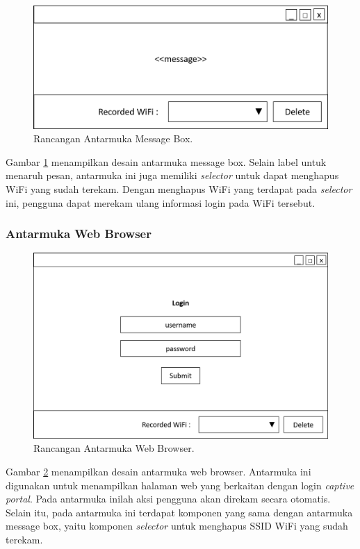 \begin{figure}[!htb]
    \centering
    \includegraphics[scale=0.5]{Gambar/UI_MessageBox.png}
    \caption[Rancangan Antarmuka Message Box.]{Rancangan Antarmuka Message Box.}
    \label{fig:RancanganAntarmukaMessageBox}
\end{figure}

Gambar \ref{fig:RancanganAntarmukaMessageBox} menampilkan desain antarmuka message box. Selain label untuk menaruh pesan, antarmuka ini juga memiliki \textit{selector} untuk dapat menghapus WiFi yang sudah terekam. Dengan menghapus WiFi yang terdapat pada \textit{selector} ini, pengguna dapat merekam ulang informasi login pada WiFi tersebut.

\subsubsection{Antarmuka Web Browser}
\label{subsec:antarmuka_web_browser}

\begin{figure}[!htb]
    \centering
    \includegraphics[scale=0.5]{Gambar/UI_WebBrowser.png}
    \caption[Rancangan Antarmuka Web Browser.]{Rancangan Antarmuka Web Browser.}
    \label{fig:RancanganAntarmukaWebBrowser}
\end{figure}

Gambar \ref{fig:RancanganAntarmukaWebBrowser} menampilkan desain antarmuka web browser. Antarmuka ini digunakan untuk menampilkan halaman web yang berkaitan dengan login \textit{captive portal}. Pada antarmuka inilah aksi pengguna akan direkam secara otomatis. Selain itu, pada antarmuka ini terdapat komponen yang sama dengan antarmuka message box, yaitu komponen \textit{selector} untuk menghapus SSID WiFi yang sudah terekam.